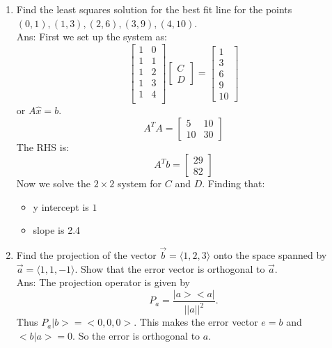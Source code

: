 \documentclass[10pt, a4paper]{article}
\theoremstyle{break}
\begin{document}
\begin{enumerate}
\begin{proof}
Taken together we have that $N(A)=N(A^TA)$. 
\end{proof}
\item Find the least squares solution for the best fit line for the points $(0,1), (1,3), (2,6),(3,9),(4,10)$.  \\
Ans:
First we set up the system as:
\begin{equation}
\begin{bmatrix}
1 & 0 \\
1 & 1 \\
1& 2 \\
1 & 3 \\
1 & 4 \\
\end{bmatrix}
\begin{bmatrix}
C \\
D
\end{bmatrix}
=
\begin{bmatrix}
1 \\
3 \\
6 \\
9 \\
10
\end{bmatrix}
\end{equation}
or $A\hat{x}=b$. 
\begin{equation}
A^TA=
\begin{bmatrix}
5&10\\
10&30
\end{bmatrix}
\end{equation}
The RHS is:
\begin{equation}
A^Tb=
\begin{bmatrix}
29 \\
82
\end{bmatrix}
\end{equation}
Now we solve the $2 \times 2$ system for $C$ and $D$. Finding that:
\begin{itemize}
\item y intercept is $1$
\item slope is 2.4
\end{itemize}



\item Find the projection of the vector $\vec{b}=\langle 1,2,3 \rangle$ onto the space spanned by $\vec{a}=\langle 1,1,-1 \rangle$. Show that the error vector is orthogonal to $\vec{a}$. \\
Ans: The projection operator is given by $$P_a=\frac{|a><a|}{||a||^2}.$$ Thus $P_a |b>=<0,0,0>$. This makes the error vector $e=b$ and $<b|a>=0$. So the error is orthogonal to $a$. 






\end{enumerate}
\end{document}
